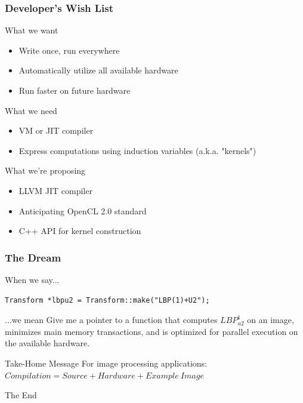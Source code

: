 \documentclass[12pt]{beamer}
\begin{document}
\begin{frame}
\frametitle{Developer's Wish List}
\begin{block}{What we want}
  \begin{itemize}
  \item Write once, run everywhere
  \item Automatically utilize all available hardware
  \item Run faster on future hardware
  \end{itemize}
\end{block}
\pause
\begin{block}{What we need}
  \begin{itemize}
  \item VM or JIT compiler
  \item Express computations using induction variables (a.k.a. "kernels")
  \end{itemize}
\end{block}
\pause
\begin{block}{What we're proposing}
  \begin{itemize}
  \item LLVM JIT compiler
  \item Anticipating OpenCL 2.0 standard
  \item C++ API for kernel construction
  \end{itemize}
\end{block}
\end{frame}

\begin{frame}[fragile]
\frametitle{The Dream}
\begin{block}{When we say...}
\begin{verbatim}
Transform *lbpu2 = Transform::make("LBP(1)+U2");
\end{verbatim}
\end{block}
\pause
\begin{block}{...we mean}
Give me a pointer to a function that computes $LBP_{u2}^{1}$ on an image,
minimizes main memory transactions,
and is optimized for parallel execution on the available hardware.
\end{block}
\pause
\begin{block}{Take-Home Message}
For image processing applications:\\
$Compilation = Source + Hardware + Example\ Image$
\end{block}
\end{frame}

\begin{frame}
\centerline{The End}
\end{frame}


\end{document}
